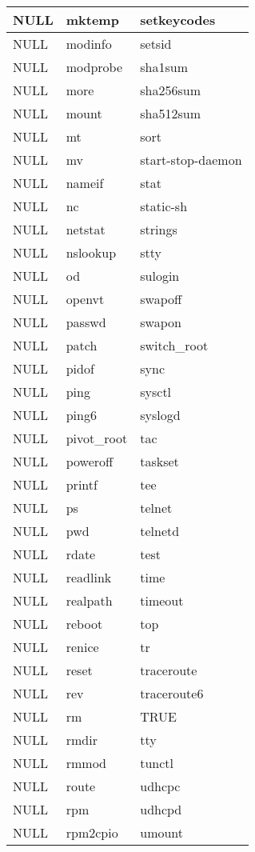 \begin{longtable}{llp{64mm}}
NULL & mktemp & setkeycodes \\ \hline
NULL & modinfo & setsid \\ \hline
NULL & modprobe & sha1sum \\ \hline
NULL & more & sha256sum \\ \hline
NULL & mount & sha512sum \\ \hline
NULL & mt & sort \\ \hline
NULL & mv & start-stop-daemon \\ \hline
NULL & nameif & stat \\ \hline
NULL & nc & static-sh \\ \hline
NULL & netstat & strings \\ \hline
NULL & nslookup & stty \\ \hline
NULL & od & sulogin \\ \hline
NULL & openvt & swapoff \\ \hline
NULL & passwd & swapon \\ \hline
NULL & patch & switch\_root \\ \hline
NULL & pidof & sync \\ \hline
NULL & ping & sysctl \\ \hline
NULL & ping6 & syslogd \\ \hline
NULL & pivot\_root & tac \\ \hline
NULL & poweroff & taskset \\ \hline
NULL & printf & tee \\ \hline
NULL & ps & telnet \\ \hline
NULL & pwd & telnetd \\ \hline
NULL & rdate & test \\ \hline
NULL & readlink & time \\ \hline
NULL & realpath & timeout \\ \hline
NULL & reboot & top \\ \hline
NULL & renice & tr \\ \hline
NULL & reset & traceroute \\ \hline
NULL & rev & traceroute6 \\ \hline
NULL & rm & TRUE \\ \hline
NULL & rmdir & tty \\ \hline
NULL & rmmod & tunctl \\ \hline
NULL & route & udhcpc \\ \hline
NULL & rpm & udhcpd \\ \hline
NULL & rpm2cpio & umount \\ \hline

\end{longtable}
